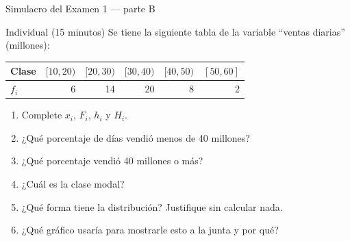 \documentclass[aspectratio=169,10pt]{beamer}
\begin{document}
\begin{frame}{Simulacro del Examen 1 — parte B}
  \begin{alertblock}{Individual (15 minutos)}
    \scriptsize
    Se tiene la siguiente tabla de la variable ``ventas diarias'' (millones):

    \vspace{0.15cm}
    \centering
    \begin{tabular}{@{}lrrrrr@{}}
      \toprule
      \textbf{Clase} & $[10,20)$ & $[20,30)$ & $[30,40)$ & $[40,50)$ &
      $[50,60]$ \\
      \midrule
      $f_i$ & 6 & 14 & 20 & 8 & 2 \\
      \bottomrule
    \end{tabular}

    \vspace{0.2cm}
    \raggedright
    \begin{enumerate}\setlength{\itemsep}{-0.05cm}
      \item Complete $x_i$, $F_i$, $h_i$ y $H_i$.
      \item ¿Qué porcentaje de días vendió menos de 40 millones?
      \item ¿Qué porcentaje vendió 40 millones o más?
      \item ¿Cuál es la clase modal?
      \item ¿Qué forma tiene la distribución? Justifique sin calcular nada.
      \item ¿Qué gráfico usaría para mostrarle esto a la junta y por qué?
    \end{enumerate}
  \end{alertblock}
\end{frame}
\end{document}
